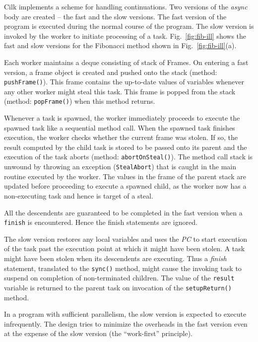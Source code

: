 \documentclass[10pt]{article}
\numberwithin{equation}{section}
\newcommand{\java}{\tt}
\begin{document}
Cilk implements a scheme for handling continuations.  Two versions of
the \emph{async} body are created -- the fast and the slow
versions. The fast version of the program is executed during the
normal course of the program. The slow version is invoked by the
worker to initiate processing of a task. Fig.~\ref{fig:fib-ill} shows
the fast and slow versions for the Fibonacci method shown in
Fig.~\ref{fig:fib-ill}(a).

Each worker maintains a deque consisting of stack of Frames. On
entering a fast version, a frame object is created and pushed onto the
stack (method: {\java pushFrame()}). This frame contains the
up-to-date values of variables whenever any other worker might steal
this task. This frame is popped from the stack (method: {\java popFrame()}) 
when this method returns.

Whenever a task is spawned, the worker immediately proceeds to execute
the spawned task like a sequential method call. When the spawned task
finishes execution, the worker checks whether the current frame was
stolen. If so, the result computed by the child task is stored to be
passed onto its parent and the execution of the task aborts (method:
{\tt abortOnSteal()}). The method call stack is unwound by throwing
an exception ({\tt StealAbort}) that is caught in the main
routine executed by the worker. The values in the frame of the parent
stack are updated before proceeding to execute a spawned child, as the
worker now has a non-executing task and hence is target of a steal. 

All the descendents are guaranteed to be completed in the fast version
when a {\java finish} is encountered. Hence the finish statements
are ignored.

The slow version restores any local variables and uses the {\em PC} to
start execution of the task past the execution point at which it might
have been stolen. A task might have been stolen when its descendents
are executing. Thus a {\em finish} statement, translated to the
{\java sync()} method, might cause the invoking task to suspend on
completion of non-terminated children. The value of the {\java result} 
variable is returned to the parent task on invocation of the
{\java setupReturn()} method. 

In a program with sufficient parallelism, the slow version is expected
to execute infrequently. The design tries to minimize the overheads in
the fast version even at the expense of the slow version (the
``work-first'' principle).
\end{document}

